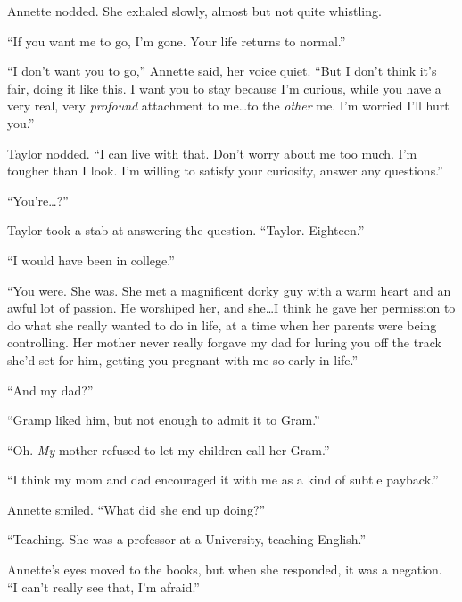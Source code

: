 Annette nodded.  She exhaled slowly, almost but not quite whistling.



``If you want me to go, I'm gone.  Your life returns to normal.''



``I don't want you to go,'' Annette said, her voice quiet.  ``But I don't think it's fair, doing it like this.  I want you to stay because I'm curious, while you have a very real, very \emph{profound} attachment to me\ldots to the \emph{other} me.  I'm worried I'll hurt you.''



Taylor nodded.  ``I can live with that.  Don't worry about me too much.  I'm tougher than I look.  I'm willing to satisfy your curiosity, answer any questions.''



``You're\ldots?''



Taylor took a stab at answering the question.  ``Taylor.  Eighteen.''



``I would have been in college.''



``You were.  She was.  She met a magnificent dorky guy with a warm heart and an awful lot of passion.  He worshiped her, and she\ldots I think he gave her permission to do what she really wanted to do in life, at a time when her parents were being controlling.  Her mother never really forgave my dad for luring you off the track she'd set for him, getting you pregnant with me so early in life.''



``And my dad?''



``Gramp liked him, but not enough to admit it to Gram.''



``Oh.  \emph{My} mother refused to let my children call her Gram.''



``I think my mom and dad encouraged it with me as a kind of subtle payback.''



Annette smiled.  ``What did she end up doing?''



``Teaching.  She was a professor at a University, teaching English.''



Annette's eyes moved to the books, but when she responded, it was a negation.  ``I can't really see that, I'm afraid.''



